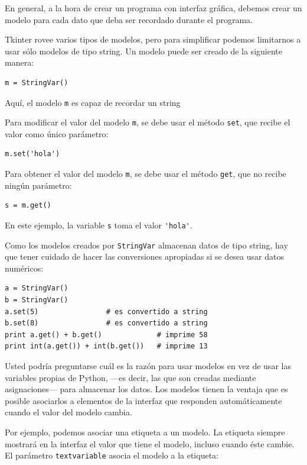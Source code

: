 En general, a la hora de crear un programa con interfaz gráfica, debemos
crear un modelo para cada dato que deba ser recordado durante el
programa.

Tkinter rovee varios tipos de modelos, pero para simplificar podemos
limitarnos a usar sólo modelos de tipo string. Un modelo puede ser
creado de la siguiente manera:

\begin{lstlisting}
m = StringVar()
\end{lstlisting}

Aquí, el modelo \lstinline!m! es capaz de recordar un string

Para modificar el valor del modelo \lstinline!m!, se debe usar el método
\lstinline!set!, que recibe el valor como único parámetro:

\begin{lstlisting}
m.set('hola')
\end{lstlisting}

Para obtener el valor del modelo \lstinline!m!, se debe usar el método
\lstinline!get!, que no recibe ningún parámetro:

\begin{lstlisting}
s = m.get()
\end{lstlisting}

En este ejemplo, la variable \lstinline!s! toma el valor
\lstinline!'hola'!.

Como los modelos creados por \lstinline!StringVar! almacenan datos de
tipo string, hay que tener cuidado de hacer las conversiones apropiadas
si se desea usar datos numéricos:

\begin{lstlisting}
a = StringVar()
b = StringVar()
a.set(5)                # es convertido a string
b.set(8)                # es convertido a string
print a.get() + b.get()             # imprime 58
print int(a.get()) + int(b.get())   # imprime 13
\end{lstlisting}

Usted podría preguntarse cuál es la razón para usar modelos en vez de
usar las variables propias de Python, ---es decir, las que son creadas
mediante asignaciones--- para almacenar los datos. Los modelos tienen la
ventaja que es posible asociarlos a elementos de la interfaz que
responden automáticamente cuando el valor del modelo cambia.

Por ejemplo, podemos asociar una etiqueta a un modelo. La etiqueta
siempre mostrará en la interfaz el valor que tiene el modelo, incluso
cuando éste cambie.
El parámetro \lstinline!textvariable!
asocia el modelo a la etiqueta:


